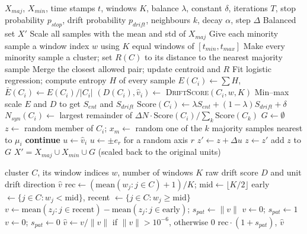 \documentclass[preprint,10pt]{elsarticle}
\begin{document}
\begin{algorithm}[!htbp]
\caption{DA-ECEBO}\label{alg:main}
\begin{algorithmic}[1]
\Require $X_{maj}$, $X_{min}$, time stamps $t$, windows $K$, balance $\lambda$, constant $\delta$, iterations $T$, stop probability $p_{stop}$, drift probability $p_{drift}$, neighbours $k$, decay $\alpha$, step $\Delta$
\Ensure Balanced set $X'$
\State Scale all samples with the mean and std of $X_{maj}$
\State Give each minority sample a window index $w$ using $K$ equal windows of $[t_{min},t_{max}]$
\State Make every minority sample a cluster; set $R(C)$ to its distance to the nearest majority sample
  \State Merge the closest allowed pair; update centroid and $R$
\EndWhile
\State Fit logistic regression; compute entropy $H$ of every sample
  \State $E(C_i)\gets\sum H$, \ $\bar E(C_i)\gets E(C_i)/|C_i|$
  \State $(D(C_i),\hat v_i)\gets$ \textsc{DriftScore}$(C_i,w,K)$ 
\EndFor
\State Min--max scale $E$ and $D$ to get $S_{ent}$ and $S_{drift}$
\State $\mathrm{Score}(C_i)\gets\lambda S_{ent}+(1-\lambda)S_{drift}+\delta$
\State $N_{syn}(C_i)\gets$ largest remainder of $\Delta N\cdot \mathrm{Score}(C_i)/\sum_k \mathrm{Score}(C_k)$
\State $G\gets\emptyset$
  \State $z\gets$ random member of $C_i$; $x_m\gets$ random one of the $k$ majority samples nearest to $\mu_i$
     \State \textbf{continue} \EndIf
      \State $u\gets\hat v_i$
    \Else
      \State $u\gets\pm e_r$ for a random axis $r$
    \EndIf
    \State $z'\gets z+\Delta u$
     \State $z\gets z'$ \EndIf
  \EndFor
  \State add $z$ to $G$
\EndFor
\State \Return $X'=X_{maj}\cup X_{min}\cup G$ (scaled back to the original units)
\end{algorithmic}
\end{algorithm}

\begin{algorithm}[!htbp]
\caption{Drift score of one cluster}\label{alg:drift}
\begin{algorithmic}[1]
\Require cluster $C$, its window indices $w$, number of windows $K$
\Ensure raw drift score $D$ and unit drift direction $\hat v$
\State $\mathrm{rec}\gets(\mathrm{mean}(w_j:j\in C)+1)/K$; \quad $\mathrm{mid}\gets\lfloor K/2\rfloor$
\State early $\gets\{j\in C:w_j<\mathrm{mid}\}$, \quad recent $\gets\{j\in C:w_j\ge\mathrm{mid}\}$
  \State $v\gets\mathrm{mean}(z_j:j\in\text{recent})-\mathrm{mean}(z_j:j\in\text{early})$; \quad $s_{pat}\gets\|v\|$
  \State $v\gets0$; \quad $s_{pat}\gets1$
\Else
  \State $v\gets0$; \quad $s_{pat}\gets0$
\EndIf
\State $\hat v\gets v/\|v\|$ if $\|v\|>10^{-6}$, otherwise $0$
\State \Return $\mathrm{rec}\cdot(1+s_{pat})$, $\hat v$
\end{algorithmic}
\end{algorithm}
\end{document}

